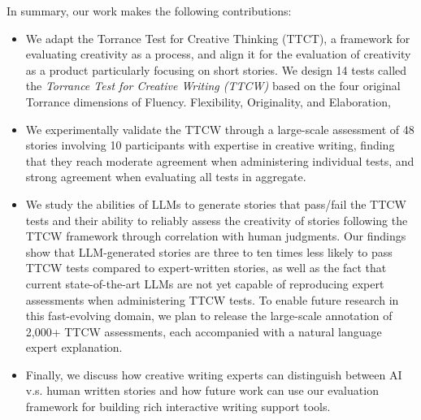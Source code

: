 In summary, our work makes the following contributions:
\begin{itemize}
    \item We adapt the Torrance Test for Creative Thinking (TTCT), a framework for evaluating creativity as a process, and align it for the evaluation of creativity as a product particularly focusing on short stories. We design 14 tests called the \textit{Torrance Test for Creative Writing (TTCW)} based on the four original Torrance dimensions of Fluency. Flexibility, Originality, and Elaboration,
    \item We experimentally validate the TTCW through a large-scale assessment of 48 stories involving 10 participants with expertise in creative writing, finding that they reach moderate agreement when administering individual tests, and strong agreement when evaluating all tests in aggregate.
    \item We study the abilities of LLMs to generate stories that pass/fail the TTCW tests and their ability to reliably assess the creativity of stories following the TTCW framework through correlation with human judgments. Our findings show that LLM-generated stories are three to ten times less likely to pass TTCW tests compared to expert-written stories, as well as the fact that current state-of-the-art LLMs are not yet capable of reproducing expert assessments when administering TTCW tests. To enable future research in this fast-evolving domain, we plan to release the large-scale annotation of 2,000+ TTCW assessments, each accompanied with a natural language expert explanation. 
    \item Finally, we discuss how creative writing experts can distinguish between AI v.s. human written stories and how future work can use our evaluation framework for building rich interactive writing support tools.
\end{itemize}
